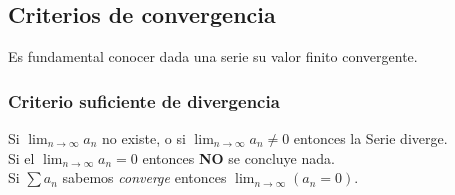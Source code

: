 \subsection{Criterios de convergencia}
Es fundamental conocer dada una serie su valor finito convergente.
\subsubsection{Criterio suficiente de divergencia}
Si $\lim_{n\to\infty}a_n$ no existe, o si $\lim_{n\to\infty}a_n\ne0$ entonces la Serie diverge.
~\\
Si el $\lim_{n\to\infty}a_n=0$ entonces \textbf{NO} se concluye nada.
~\\
Si $\sum a_n$ sabemos \textit{converge} entonces $\lim_{n\to\infty}(a_n=0)$.
